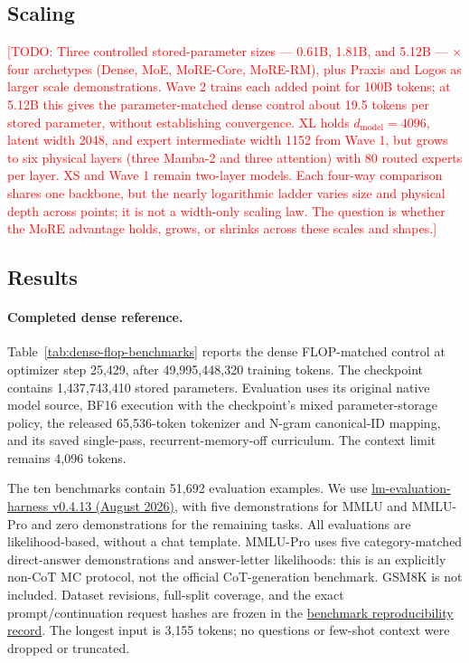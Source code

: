\documentclass[11pt]{article}
\newcommand{\TODO}[1]{\textcolor{red}{[TODO: #1]}}
\begin{document}
\subsection{Scaling}

\TODO{Three controlled stored-parameter sizes --- 0.61B, 1.81B, and 5.12B ---
$\times$ four archetypes (Dense, MoE, MoRE-Core, MoRE-RM), plus Praxis and Logos
as larger scale demonstrations. Wave 2 trains each added point for 100B tokens;
at 5.12B this gives the parameter-matched dense control about 19.5 tokens per
stored parameter, without establishing convergence. XL holds
$d_{\mathrm{model}}=4096$, latent width 2048, and expert intermediate width
1152 from Wave 1, but grows to six physical layers (three Mamba-2 and three
attention) with 80 routed experts per layer. XS and Wave 1 remain two-layer
models. Each four-way comparison shares one backbone, but the nearly
logarithmic ladder varies size and physical depth across points; it is not a
width-only scaling law. The question is whether the MoRE advantage holds,
grows, or shrinks across these scales and shapes.}

\subsection{Results}

\paragraph{Completed dense reference.}
Table~\ref{tab:dense-flop-benchmarks} reports the dense FLOP-matched control at
optimizer step 25{,}429, after 49{,}995{,}448{,}320 training tokens.
The checkpoint contains 1{,}437{,}743{,}410 stored parameters. Evaluation uses
its original native model source, BF16 execution with the checkpoint's mixed
parameter-storage policy, the released 65{,}536-token tokenizer and N-gram
canonical-ID mapping, and its saved single-pass, recurrent-memory-off
curriculum. The context limit remains 4{,}096 tokens.

The ten benchmarks contain 51{,}692 evaluation examples. We use
\href{https://github.com/EleutherAI/lm-evaluation-harness/releases/tag/v0.4.13}
{lm-evaluation-harness v0.4.13 (August 2026)}, with five demonstrations for
MMLU and MMLU-Pro and zero demonstrations for the remaining tasks.
All evaluations are likelihood-based, without a chat template.
MMLU-Pro uses five category-matched direct-answer demonstrations and answer-letter
likelihoods: this is an explicitly non-CoT MC protocol, not the official
CoT-generation benchmark. GSM8K is not included. Dataset revisions, full-split
coverage, and the exact prompt/continuation request hashes are frozen in the
\href{https://github.com/lernex/Hollowstar/tree/main/reports/more-dense-benchmarks-20260905}
{benchmark reproducibility record}. The longest input is 3{,}155 tokens; no
questions or few-shot context were dropped or truncated.
\end{document}
